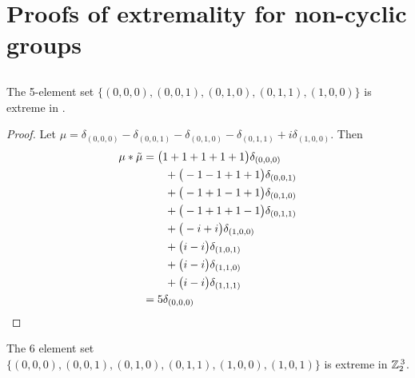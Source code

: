 \section{Proofs of extremality for non-cyclic groups}\label{secnoncyclicgps}



\subsection{}
\begin{prop}
\cite{MR627683}
\label{prop5inZp2.Zp2.Zp2} The 5-element set 
$\{(0, 0, 0), (0, 0, 1), (0, 1, 0), (0, 1, 1), (1, 0, 0) \}$ 
is extreme in .
\end{prop}

 
\begin{proof}
Let  $\mu =  \delta_{(0,0,0)}-\delta_{(0,0,1)}-\delta_{(0,1,0)}-\delta_{(0,1,1)}+i\delta_{(1,0,0)}
$.  Then 
\begin{align*} 
\mu * \tilde \mu & = \big(1+1+1+1+1\big)\delta_{(0,0,0)}
\\&\qquad
+\big(-1-1+1+1\big)\delta_{(0,0,1)}
\\&\qquad
+\big(-1+1-1+1\big)\delta_{(0,1,0)}
\\&\qquad
+\big(-1+1+1-1\big)\delta_{(0,1,1)}
\\&\qquad
+\big(-i+i\big)\delta_{(1,0,0)}
\\&\qquad
+\big(i-i\big)\delta_{(1,0,1)}
\\&\qquad
+\big(i-i\big)\delta_{(1,1,0)}
\\&\qquad
+\big(i-i\big)\delta_{(1,1,1)}\\&=5\delta_{(0 , 0, 0)}\qedhere
\end{align*}
\end{proof}


\begin{prop}\label{prop6inZ2.X.Z2.X.Z2}
The 6 element set $\{(0, 0, 0),  (0, 0, 1),  (0, 1, 0),  (0, 1, 1),  (1, 0, 0),  (1, 0, 1) \}$ is extreme in $\texttt{$\mathbb Z_{2}^{\,3}$}$. \newline \end{prop} 



